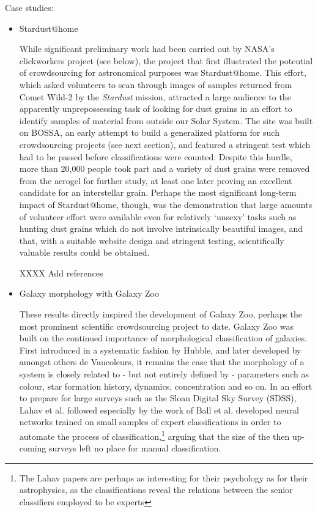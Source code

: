 \documentclass{ar2e}
\begin{document}
Case studies:
\begin{itemize}

\item Stardust@home

While significant preliminary work had been carried out by NASA's clickworkers
project (see below), the project that first illustrated the potential of
crowdsourcing for astronomical purposes was Stardust@home. This effort, which
asked volunteers to scan through images of samples returned from Comet Wild-2
by the \emph{Stardust} mission, attracted a large audience to the apparently
unprepossessing task of looking for dust grains in an effort to identify
samples of material from outside our Solar System. The site was built on
BOSSA, an early attempt to build a generalized platform for such crowdsourcing
projects (see next section), and featured a stringent test which had to be
passed before classifications were counted. Despite this hurdle, more than
20,000 people took part and a variety of dust grains were removed from the
aerogel for further study, at least one later proving an excellent candidate
for an interstellar grain. Perhaps the most significant long-term impact of
Stardust@home, though, was the demonstration that large amounts of volunteer
effort were available even for relatively `unsexy' tasks such as hunting dust
grains which do not involve intrinsically beautiful images, and that, with a
suitable website design and stringent testing, scientifically valuable results
could be obtained. 

XXXX Add references 


\item Galaxy morphology with Galaxy Zoo

These results directly inspired the development of Galaxy Zoo, perhaps the
most prominent scientific crowdsourcing project to date. Galaxy Zoo was built
on the continued importance of morphological classification of galaxies. First
introduced in a systematic fashion by Hubble, and later developed by amongst
others de Vaucoleurs, it remains the case that the morphology of a system is
closely related to - but not entirely defined by - parameters such as colour,
star formation history, dynamics, concentration and so on. In an effort to
prepare for large surveys such as the Sloan Digital Sky Survey (SDSS), Lahav
et al. followed especially by the work of Ball et al. developed neural
networks trained on small samples of expert classifications in order to
automate the process of classification,\footnote{The Lahav papers are perhaps
as interesting for their psychology as for their astrophysics, as the
classifications reveal the relations between the senior classifiers employed
to be experts} arguing that the size of the then up-coming surveys left no
place for manual classification.


\end{itemize}
\end{document}

